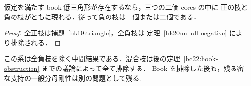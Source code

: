 \begin{corollary}
\label{bk20:mixed-necessary}
仮定を満たす book 低三角形が存在するなら，三つの二価 cores の中に
正の枝と負の枝がともに現れる．従って負の枝は一個または二個である．
\end{corollary}

\begin{proof}
全正枝は補題~\ref{bk19:triangle}，全負枝は
定理~\ref{bk20:no-all-negative} により排除される．
\end{proof}

この系は全負枝を除く中間結果である．混合枝は後の定理~\ref{bc22:book-obstruction} までの議論によって全て排除する．
Book を排除した後も，残る密な支持の一般分母剛性は別の問題として残る．
